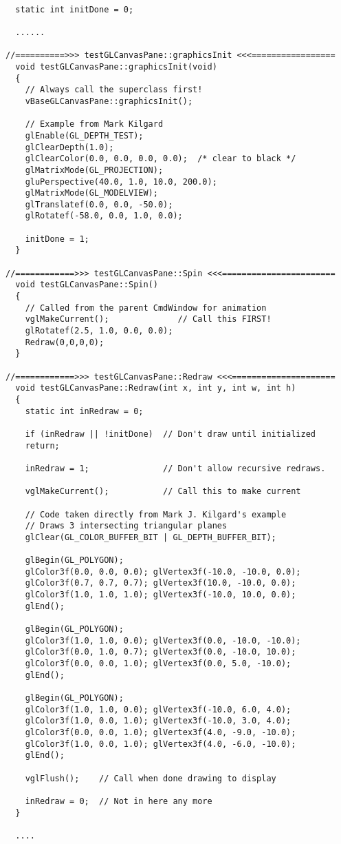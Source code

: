 \footnotesize
\begin{verbatim}

  static int initDone = 0;

  ......

//==========>>> testGLCanvasPane::graphicsInit <<<=================
  void testGLCanvasPane::graphicsInit(void)
  {
    // Always call the superclass first!
    vBaseGLCanvasPane::graphicsInit();

    // Example from Mark Kilgard
    glEnable(GL_DEPTH_TEST);
    glClearDepth(1.0);
    glClearColor(0.0, 0.0, 0.0, 0.0);  /* clear to black */
    glMatrixMode(GL_PROJECTION);
    gluPerspective(40.0, 1.0, 10.0, 200.0);
    glMatrixMode(GL_MODELVIEW);
    glTranslatef(0.0, 0.0, -50.0);
    glRotatef(-58.0, 0.0, 1.0, 0.0);

    initDone = 1;
  }

//============>>> testGLCanvasPane::Spin <<<=======================
  void testGLCanvasPane::Spin()
  {
    // Called from the parent CmdWindow for animation
    vglMakeCurrent();              // Call this FIRST!
    glRotatef(2.5, 1.0, 0.0, 0.0);
    Redraw(0,0,0,0);
  }

//============>>> testGLCanvasPane::Redraw <<<=====================
  void testGLCanvasPane::Redraw(int x, int y, int w, int h)
  {
    static int inRedraw = 0;

    if (inRedraw || !initDone)  // Don't draw until initialized
 	return;

    inRedraw = 1;               // Don't allow recursive redraws.

    vglMakeCurrent();           // Call this to make current

    // Code taken directly from Mark J. Kilgard's example
    // Draws 3 intersecting triangular planes
    glClear(GL_COLOR_BUFFER_BIT | GL_DEPTH_BUFFER_BIT);

    glBegin(GL_POLYGON);
    glColor3f(0.0, 0.0, 0.0); glVertex3f(-10.0, -10.0, 0.0);
    glColor3f(0.7, 0.7, 0.7); glVertex3f(10.0, -10.0, 0.0);
    glColor3f(1.0, 1.0, 1.0); glVertex3f(-10.0, 10.0, 0.0);
    glEnd();

    glBegin(GL_POLYGON);
    glColor3f(1.0, 1.0, 0.0); glVertex3f(0.0, -10.0, -10.0);
    glColor3f(0.0, 1.0, 0.7); glVertex3f(0.0, -10.0, 10.0);
    glColor3f(0.0, 0.0, 1.0); glVertex3f(0.0, 5.0, -10.0);
    glEnd();

    glBegin(GL_POLYGON);
    glColor3f(1.0, 1.0, 0.0); glVertex3f(-10.0, 6.0, 4.0);
    glColor3f(1.0, 0.0, 1.0); glVertex3f(-10.0, 3.0, 4.0);
    glColor3f(0.0, 0.0, 1.0); glVertex3f(4.0, -9.0, -10.0);
    glColor3f(1.0, 0.0, 1.0); glVertex3f(4.0, -6.0, -10.0);
    glEnd();

    vglFlush();    // Call when done drawing to display

    inRedraw = 0;  // Not in here any more
  }

  ....
\end{verbatim}
\normalfont\normalsize

